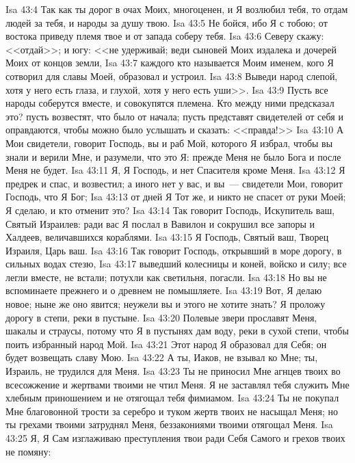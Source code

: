\vs Isa 43:4 Так как ты дорог в очах Моих, многоценен, и Я возлюбил тебя, то отдам  людей за тебя, и народы за душу твою.
\vs Isa 43:5 Не бойся, ибо Я с тобою; от востока приведу племя твое и от запада соберу тебя.
\vs Isa 43:6 Северу скажу: <<отдай>>; и югу: <<не удерживай; веди сыновей Моих издалека и дочерей Моих от концов земли,
\vs Isa 43:7 каждого кто называется Моим именем, кого Я сотворил для славы Моей, образовал и устроил.
\vs Isa 43:8 Выведи народ слепой, хотя у него есть глаза, и глухой, хотя у него есть уши>>.
\vs Isa 43:9 Пусть все народы соберутся вместе, и совокупятся племена. Кто между ними предсказал это? пусть возвестят, что было от начала; пусть представят свидетелей от себя и оправдаются, чтобы можно было услышать и сказать: <<правда!>>
\vs Isa 43:10 А Мои свидетели, говорит Господь, вы и раб Мой, которого Я избрал, чтобы вы знали и верили Мне, и разумели, что это Я: прежде Меня не было Бога и после Меня не будет.
\rsbpar\vs Isa 43:11 Я, Я Господь, и нет Спасителя кроме Меня.
\vs Isa 43:12 Я предрек и спас, и возвестил; а иного нет у вас, и вы~--- свидетели Мои, говорит Господь, что Я Бог;
\vs Isa 43:13 от  дней Я Тот же, и никто не спасет от руки Моей; Я сделаю, и кто отменит это?
\rsbpar\vs Isa 43:14 Так говорит Господь, Искупитель ваш, Святый Израилев: ради вас Я послал в Вавилон и сокрушил все запоры и Халдеев, величавшихся кораблями.
\vs Isa 43:15 Я Господь, Святый ваш, Творец Израиля, Царь ваш.
\rsbpar\vs Isa 43:16 Так говорит Господь, открывший в море дорогу, в сильных водах стезю,
\vs Isa 43:17 выведший колесницы и коней, войско и силу; все легли вместе, не встали; потухли как светильня, погасли.
\vs Isa 43:18 Но вы не вспоминаете прежнего и о древнем не помышляете.
\vs Isa 43:19 Вот, Я делаю новое; ныне же оно явится; неужели вы и этого не хотите знать? Я проложу дорогу в степи, реки в пустыне.
\vs Isa 43:20 Полевые звери прославят Меня, шакалы и страусы, потому что Я в пустынях дам воду, реки в сухой степи, чтобы поить избранный народ Мой.
\vs Isa 43:21 Этот народ Я образовал для Себя; он будет возвещать славу Мою.
\vs Isa 43:22 А ты, Иаков, не взывал ко Мне; ты, Израиль, не трудился для Меня.
\vs Isa 43:23 Ты не приносил Мне агнцев твоих во всесожжение и жертвами твоими не чтил Меня. Я не заставлял тебя служить Мне хлебным приношением и не отягощал тебя фимиамом.
\vs Isa 43:24 Ты не покупал Мне благовонной трости за серебро и туком жертв твоих не насыщал Меня; но ты грехами твоими затруднял Меня, беззакониями твоими отягощал Меня.
\vs Isa 43:25 Я, Я Сам изглаживаю преступления твои ради Себя Самого и грехов твоих не помяну:
